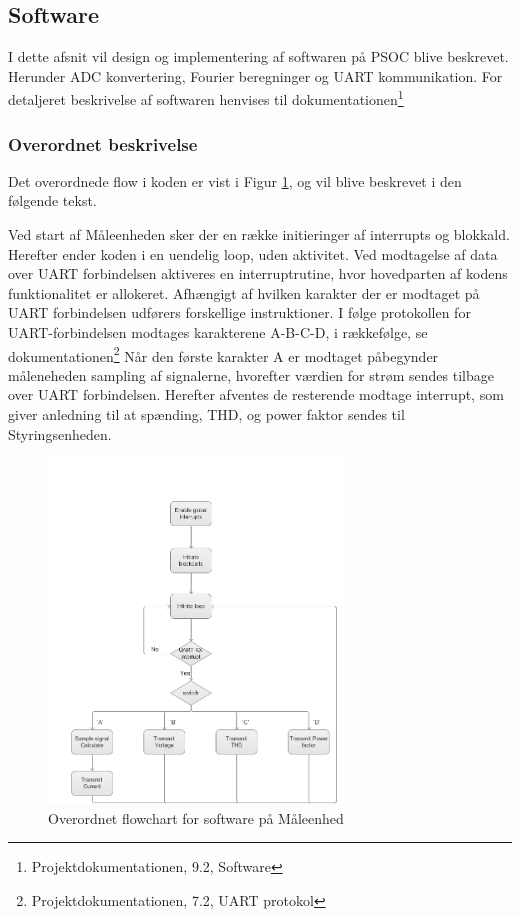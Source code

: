 
\subsection{Software}
I dette afsnit vil design og implementering af softwaren på PSOC blive beskrevet. Herunder ADC konvertering, Fourier beregninger og  UART kommunikation. For detaljeret beskrivelse af softwaren henvises til dokumentationen\footnote{Projektdokumentationen, 9.2, Software}

\subsubsection{Overordnet beskrivelse}
Det overordnede flow i koden er vist i Figur \ref{fig:MEflowchart}, og vil blive beskrevet i den følgende tekst.  

Ved start af Måleenheden sker der en række initieringer af interrupts og blokkald. Herefter ender koden i en uendelig loop, uden aktivitet. Ved modtagelse af data over UART forbindelsen aktiveres en interruptrutine, hvor hovedparten af kodens funktionalitet er allokeret. 
Afhængigt af hvilken karakter der er modtaget på UART forbindelsen udførers forskellige instruktioner. I følge protokollen for UART-forbindelsen modtages karakterene A-B-C-D, i rækkefølge, se dokumentationen\footnote{Projektdokumentationen, 7.2, UART protokol}
Når den første karakter A er modtaget påbegynder måleneheden sampling af signalerne, hvorefter værdien for strøm sendes tilbage over UART forbindelsen. Herefter afventes de resterende modtage interrupt, som giver anledning til at spænding, THD, og power faktor sendes til Styringsenheden. 
\begin{figure}[h] %
	\centering
	\includegraphics[width=0.7\textwidth]{Figure/MEflowchart.png}
	\caption{Overordnet flowchart for software på Måleenhed}
	\label{fig:MEflowchart}
\end{figure}




